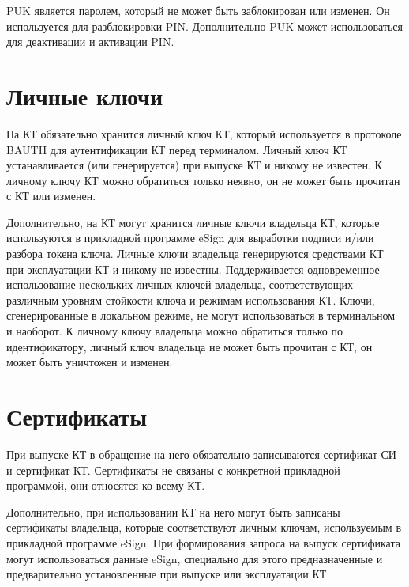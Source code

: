 PUK является паролем, который не может быть заблокирован или изменен. 
Он используется для разблокировки 
PIN. Дополнительно PUK может использоваться для деактивации и активации PIN. 

\section{Личные ключи}\label{OBJ.Keys}

На КТ обязательно хранится личный ключ КТ,
который используется в протоколе BAUTH
для аутентификации КТ перед терминалом.
Личный ключ КТ устанавливается (или генерируется) при выпуске КТ и никому не 
известен. К личному ключу КТ можно обратиться только неявно, он не может быть 
прочитан с КТ или изменен. 

Дополнительно, на КТ могут хранится личные ключи владельца КТ, 
которые используются в прикладной программе eSign для выработки 
подписи и/или разбора токена ключа.
Личные ключи владельца генерируются средствами КТ при эксплуатации
КТ и никому не известны. 
Поддерживается одновременное 
использование нескольких личных ключей владельца, 
соответствующих различным уровням стойкости ключа и режимам
использования КТ.
Ключи, сгенерированные в локальном режиме, не могут использоваться 
в терминальном и наоборот.
К личному ключу владельца можно обратиться только по идентификатору, 
личный ключ владельца не может быть прочитан с КТ, 
он может быть уничтожен и изменен.

\section{Сертификаты}\label{OBJ.Certs}

При выпуске КТ в обращение на него обязательно записываются сертификат 
СИ и сертификат КТ. 
Сертификаты не связаны с конкретной 
прикладной программой, они относятся ко всему КТ. 

Дополнительно, при иcпользовании КТ на него могут быть записаны
сертификаты владельца, которые соответствуют личным ключам, используемым
в прикладной программе eSign.
При формирования запроса на выпуск сертификата могут использоваться
данные eSign, специально для этого предназначенные и предварительно
установленные при выпуске или эксплуатации КТ.

